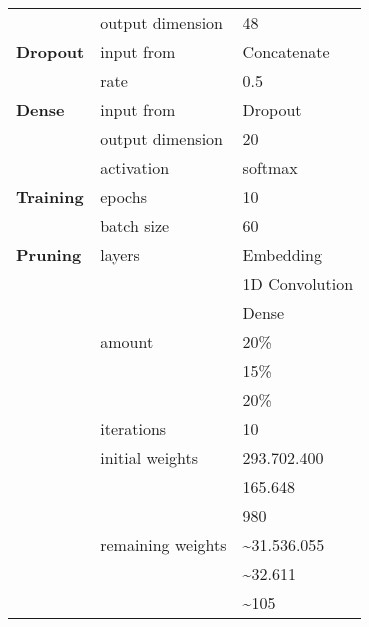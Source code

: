 \begin{appendices}
\begin{tabularx}{\textwidth}[!h]{X X X}
	& output dimension & 48\\
	[8pt]
	\textbf{Dropout} & input from & Concatenate\\
	& rate & 0.5\\
	[8pt]
	\textbf{Dense} & input from & Dropout\\
	& output dimension & 20\\
	& activation & softmax\\
	\hline
	\textbf{Training} & epochs & 10\\
	& batch size & 60\\
	\hline
	\textbf{Pruning} & layers & Embedding\\
	& & 1D Convolution\\
	& & Dense\\
	& amount & 20\%\\
	& & 15\%\\
	& & 20\%\\
	& iterations & 10\\
	& initial weights & 293.702.400\\
	& & 165.648\\
	& & 980\\
	& remaining weights & \textasciitilde31.536.055\\
	& & \textasciitilde32.611\\
	& & \textasciitilde105\\
	\hline
\end{tabularx}



\end{appendices}
